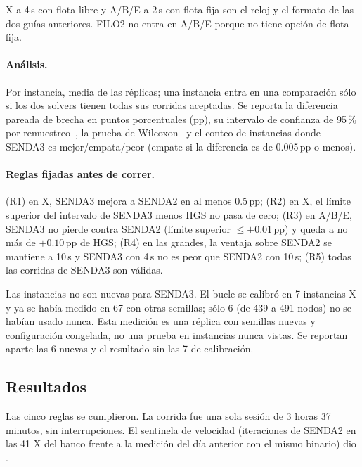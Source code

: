 \documentclass[11pt,a4paper]{article}
\newcommand{\sendados}{SENDA2}
\newcommand{\sendatres}{SENDA3}
\newcommand{\pp}{\,pp}
\begin{document}
X a 4\,s con flota libre y A/B/E a 2\,s con flota fija son el reloj y el formato de las dos guías
anteriores. FILO2 no entra en A/B/E porque no tiene opción de flota fija.

\paragraph{Análisis.} Por instancia, media de las réplicas; una instancia entra en una comparación
sólo si los dos solvers tienen todas sus corridas aceptadas. Se reporta la diferencia pareada de
brecha en puntos porcentuales (pp), su intervalo de confianza de 95\,\% por remuestreo~\cite{efron1979},
la prueba de Wilcoxon~\cite{wilcoxon1945} y el conteo de instancias donde \sendatres{} es
mejor/empata/peor (empate si la diferencia es de 0.005\pp{} o menos).

\paragraph{Reglas fijadas antes de correr.} (R1) en X, \sendatres{} mejora a \sendados{} en al menos
0.5\pp; (R2) en X, el límite superior del intervalo de \sendatres{} menos HGS no pasa de cero; (R3) en
A/B/E, \sendatres{} no pierde contra \sendados{} (límite superior $\le +0.01$\pp) y queda a no más de
$+0.10$\pp{} de HGS; (R4) en las grandes, la ventaja sobre \sendados{} se mantiene a 10\,s y \sendatres{}
con 4\,s no es peor que \sendados{} con 10\,s; (R5) todas las corridas de \sendatres{} son válidas.

\begin{leccion}
Las instancias no son nuevas para \sendatres. El bucle se calibró en 7 instancias X y ya se había
medido en 67 con otras semillas; sólo 6 (de 439 a 491 nodos) no se habían usado nunca. Esta medición
es una réplica con semillas nuevas y configuración congelada, no una prueba en instancias nunca
vistas. Se reportan aparte las 6 nuevas y el resultado sin las 7 de calibración.
\end{leccion}

\subsection{Resultados}

Las cinco reglas se cumplieron. La corrida fue una sola sesión de 3 horas 37 minutos, sin
interrupciones. El sentinela de velocidad (iteraciones de \sendados{} en las 41 X del banco frente a
la medición del día anterior con el mismo binario) dio \SentinelaDos.
\end{document}
